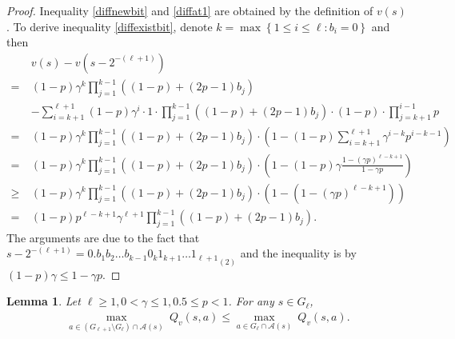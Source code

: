 \documentclass{article}
\newtheorem{lemma}[theorem]{Lemma}
\theoremstyle{named}
\newcommand{\cA}{\mathcal{A}}
\newcommand{\set}[1]{\left\{#1\right\}}
\newcommand{\bracket}[1]{\left(#1\right)}
\begin{document}
\begin{proof}
Inequality \eqref{diffnewbit} and \eqref{diffat1} are obtained by the definition of $v(s)$. To derive inequality \eqref{diffexistbit}, denote $k = \max\set{1\le i \le \ell: b_i=0}$ and then 
\begin{align*}
& v(s) - v\bracket{s-2^{-(\ell+1)}} \\ 
=\ & (1-p) \gamma^{k}\prod_{j=1}^{k-1}((1-p)+(2p-1)b_j) \\
& - \sum_{i=k+1}^{\ell+1} (1-p) \gamma^i \cdot 1 \cdot \prod_{j=1}^{k-1}((1-p)+(2p-1)b_j) \cdot (1-p) \cdot \prod_{j=k+1}^{i-1} p \\
=\ & (1-p) \gamma^{k} \prod_{j=1}^{k-1}((1-p)+(2p-1)b_j) \cdot \bracket{1 - (1-p)\sum_{i=k+1}^{\ell+1} \gamma^{i-k} p^{i-k-1}}\\
=\ & (1-p) \gamma^{k} \prod_{j=1}^{k-1}((1-p)+(2p-1)b_j) \cdot \bracket{1 - (1-p)\gamma \frac{1-(\gamma p)^{\ell-k+1}}{1-\gamma p}}\\
\ge\ & (1-p) \gamma^{k} \prod_{j=1}^{k-1}((1-p)+(2p-1)b_j) \cdot \bracket{1 - \bracket{1-(\gamma p)^{\ell-k+1}} }\\
=\ & (1-p) p^{\ell-k+1} \gamma^{\ell+1} \prod_{j=1}^{k-1}((1-p)+(2p-1)b_j).
\end{align*}
The arguments are due to the fact that $s-2^{-(\ell+1)} = {0.b_1 b_2 \dots b_{k-1} 0_k 1_{k+1} \dots 1_{\ell+1}}_{(2)}$ and the inequality is by $(1-p)\gamma \le 1-\gamma p$.
\end{proof}

\begin{lemma}
\label{newa}
Let $\ell\geq 1, 0<\gamma \le 1, 0.5 \le p <1$.    
For any $s\in G_{\ell}$, 
\begin{align*}
\max_{a\in (G_{\ell+1}\setminus G_{\ell})\cap \cA(s)}\ Q_v(s,a) \le \max_{a\in G_{\ell}\cap \cA(s)}\ Q_v(s,a) .
\end{align*}
\end{lemma}
\end{document}
